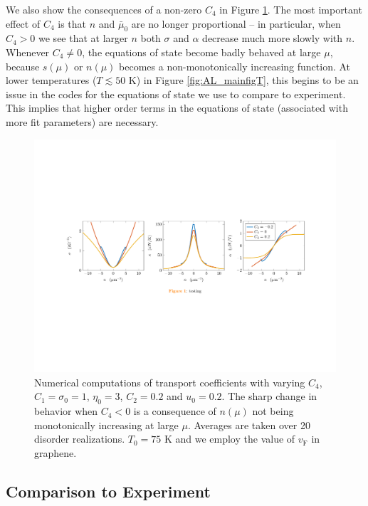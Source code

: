 We also show the consequences of a non-zero $C_4$ in Figure \ref{fig:AL_c4fig}.   The most important effect of $C_4$ is that $n$ and $\bar\mu_0$ are no longer proportional -- in particular, when $C_4>0$ we see that at larger $n$ both $\sigma$ and $\alpha$ decrease much more slowly with $n$.   Whenever $C_4\ne 0$, the equations of state become badly behaved at large $\mu$,  because $s(\mu)$ or $n(\mu)$ becomes a non-monotonically increasing function.  At lower temperatures ($T\lesssim 50$ K) in Figure \ref{fig:AL_mainfigT}, this begins to be an issue in the codes for the equations of state  we use to compare to experiment.  This implies that higher order terms in the equations of state (associated with more fit parameters) are necessary.

\begin{figure}[t]
\centering
\includegraphics[width=7in]{figures/hydro_theory/c4plot.pdf}
\caption{Numerical computations of transport coefficients with varying $C_4$, $C_1=\sigma_0=1$, $\eta_0=3$, $C_2=0.2$ and $u_0=0.2$.    The sharp change in behavior when $C_4<0$ is a consequence of $n(\mu)$ not being monotonically increasing at large $\mu$.    Averages are taken over 20 disorder realizations.  $T_0=75$ K and we employ the value of $v_{\mathrm{F}}$ in graphene.  }
\label{fig:AL_c4fig}
\end{figure}


\subsection{Comparison to Experiment}

